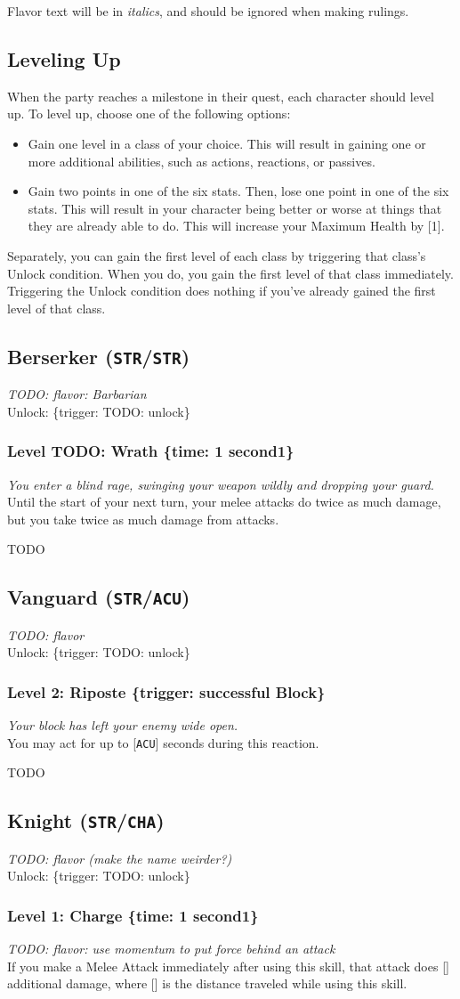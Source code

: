 \documentclass[12pt]{article}
\newcommand{\STR}{\texttt{STR}}
\newcommand{\ACU}{\texttt{ACU}}
\newcommand{\CHA}{\texttt{CHA}}
\newcommand{\X}{\text{{\lower 0.2mm \hbox{X}}}}
\newcommand{\TIME}[1]{\{time: #1 second\if1#1{}\else{s}\fi\}}
\newcommand{\TRIG}[1]{\{trigger: #1\}}
\newcommand{\Class}[4]{\pagebreak\subsection{#1 (#2)}\label{#1}\textit{#3}\\[1mm]Unlock: \TRIG{#4}}
\newcommand{\Skill}[5]{\subsubsection{Level #1: #2 #3}\textit{#4}\\[1mm]#5}
\begin{document}
Flavor text will be in \textit{italics}, and should be ignored when making rulings.

\subsection{Leveling Up}

When the party reaches a milestone in their quest, each character should level up. To level up, choose one of the following options:
\begin{itemize}
\item Gain one level in a class of your choice. This will result in gaining one or more additional abilities, such as actions, reactions, or passives.
\item Gain two points in one of the six stats. Then, lose one point in one of the six stats. This will result in your character being better or worse at things that they are already able to do. This will increase your Maximum Health by [1].
\end{itemize}

Separately, you can gain the first level of each class by triggering that class's Unlock condition. When you do, you gain the first level of that class immediately. Triggering the Unlock condition does nothing if you've already gained the first level of that class.

%

\Class{Berserker}{\STR/\STR}
{TODO: flavor: Barbarian}
{TODO: unlock}

\Skill{TODO}{Wrath}{\TIME{1}}
{You enter a blind rage, swinging your weapon wildly and dropping your guard.}
{Until the start of your next turn, your melee attacks do twice as much damage, but you take twice as much damage from attacks.}

TODO

%

%

%

\Class{Vanguard}{\STR/\ACU}
{TODO: flavor}
{TODO: unlock}

\Skill{2}{Riposte}{\TRIG{successful Block}}
{Your block has left your enemy wide open.}
{You may act for up to [\ACU] seconds during this reaction.}

TODO

%

%

\Class{Knight}{\STR/\CHA}
{TODO: flavor (make the name weirder?)}
{TODO: unlock}

\Skill{1}{Charge}{\TIME{1}}
{TODO: flavor: use momentum to put force behind an attack}
{If you make a Melee Attack immediately after using this skill, that attack does [\X] additional damage, where [\X] is the distance traveled while using this skill.}
\end{document}
